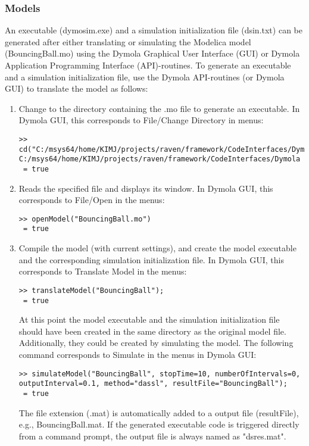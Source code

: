 \subsubsection{Models}
An executable (dymosim.exe) and a simulation initialization file (dsin.txt) can be generated after either translating or simulating the
Modelica model (BouncingBall.mo) using the Dymola Graphical User Interface (GUI) or Dymola Application Programming Interface (API)-routines.
To generate an executable and a simulation initialization file, use the Dymola API-routines (or Dymola GUI) to translate the model as follows:
\begin{enumerate}
\item Change to the directory containing the .mo file to generate an executable.  In Dymola GUI, this corresponds to File/Change Directory in menus:
\begin{lstlisting}
>> cd("C:/msys64/home/KIMJ/projects/raven/framework/CodeInterfaces/Dymola");
C:/msys64/home/KIMJ/projects/raven/framework/CodeInterfaces/Dymola
 = true
\end{lstlisting}
\item Reads the specified file and displays its window.  In Dymola GUI, this corresponds to File/Open in the menus:
\begin{lstlisting}
>> openModel("BouncingBall.mo")
 = true
\end{lstlisting}
\item Compile the model (with current settings), and create the model executable and the corresponding simulation initialization file.  In Dymola GUI, this corresponds to Translate Model in the menus:
\begin{lstlisting}
>> translateModel("BouncingBall");
 = true
\end{lstlisting}
At this point the model executable and the simulation initialization file should have been created in the same directory as the original model file.
Additionally, they could be created by simulating the model.  The following command corresponds to Simulate in the menus in Dymola GUI:
\begin{lstlisting}
>> simulateModel("BouncingBall", stopTime=10, numberOfIntervals=0, outputInterval=0.1, method="dassl", resultFile="BouncingBall");
 = true
\end{lstlisting}
The file extension (.mat) is automatically added to a output file (resultFile), e.g., BouncingBall.mat.  If the generated executable code is triggered directly from a
command prompt, the output file is always named as "dsres.mat".
\end{enumerate}
